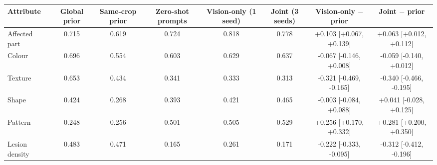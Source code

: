 \begin{tabular}{lccccccc}\toprule Attribute & Global prior & Same-crop prior & Zero-shot prompts & Vision-only (1 seed) & Joint (3 seeds) & Vision-only $-$ prior & Joint $-$ prior\\\midrule
Affected part & 0.715 & 0.619 & 0.724 & 0.818 & 0.778 & +0.103 [+0.067, +0.139] & +0.063 [+0.012, +0.112]\\
Colour & 0.696 & 0.554 & 0.603 & 0.629 & 0.637 & -0.067 [-0.146, +0.008] & -0.059 [-0.140, +0.012]\\
Texture & 0.653 & 0.434 & 0.341 & 0.333 & 0.313 & -0.321 [-0.469, -0.165] & -0.340 [-0.466, -0.195]\\
Shape & 0.424 & 0.268 & 0.393 & 0.421 & 0.465 & -0.003 [-0.084, +0.088] & +0.041 [-0.028, +0.125]\\
Pattern & 0.248 & 0.256 & 0.501 & 0.505 & 0.529 & +0.256 [+0.170, +0.332] & +0.281 [+0.200, +0.350]\\
Lesion density & 0.483 & 0.471 & 0.165 & 0.261 & 0.171 & -0.222 [-0.333, -0.095] & -0.312 [-0.412, -0.196]\\
\bottomrule\end{tabular}
